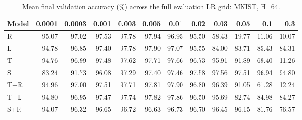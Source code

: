 \begin{table}[htbp]
\centering
\caption{Mean final validation accuracy (\%) across the full evaluation LR grid: MNIST, H=64.}
\label{tab:lrmat:mnist:64}
\scriptsize
\begin{tabular}{@{}lrrrrrrrrrrr@{}}
\toprule
Model & 0.0001 & 0.0003 & 0.001 & 0.003 & 0.005 & 0.01 & 0.02 & 0.03 & 0.05 & 0.1 & 0.3 \\
\midrule
R & 95.07 & 97.02 & 97.53 & 97.78 & 97.94 & 96.95 & 95.50 & 58.43 & 19.77 & 11.06 & 10.07 \\
L & 94.78 & 96.85 & 97.40 & 97.78 & 97.90 & 97.07 & 95.55 & 84.00 & 83.71 & 85.43 & 84.31 \\
T & 94.76 & 96.99 & 97.48 & 97.62 & 97.71 & 97.66 & 96.73 & 95.91 & 91.89 & 69.40 & 11.26 \\
S & 83.24 & 91.73 & 96.08 & 97.29 & 97.40 & 97.46 & 97.58 & 97.56 & 97.51 & 96.94 & 94.80 \\
T+R & 94.96 & 97.00 & 97.51 & 97.71 & 97.81 & 97.90 & 96.80 & 96.39 & 91.05 & 61.28 & 12.24 \\
T+L & 94.80 & 96.95 & 97.47 & 97.74 & 97.82 & 97.86 & 96.50 & 95.69 & 82.74 & 84.98 & 84.27 \\
S+R & 94.07 & 96.32 & 96.65 & 96.72 & 96.63 & 96.73 & 96.70 & 96.45 & 96.15 & 81.76 & 76.57 \\
\bottomrule
\end{tabular}
\end{table}
